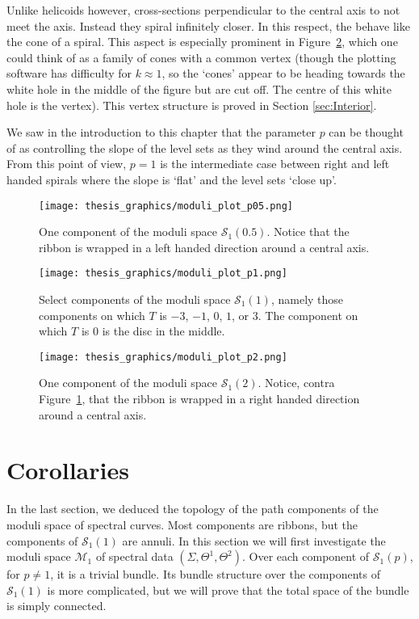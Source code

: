 Unlike helicoids however, cross-sections perpendicular to the central axis to not meet the axis. Instead they spiral infinitely closer. In this respect, the behave like the cone of a spiral. This aspect is especially prominent in Figure~\ref{fig:p1 plot}, which one could think of as a family of cones with a common vertex (though the plotting software has difficulty for $k\approx 1$, so the `cones' appear to be heading towards the white hole in the middle of the figure but are cut off. The centre of this white hole is the vertex). This vertex structure is proved in Section \ref{sec:Interior}.

We saw in the introduction to this chapter that the parameter $p$ can be thought of as controlling the slope of the level sets as they wind around the central axis. From this point of view, $p=1$ is the intermediate case between right and left handed spirals where the slope is `flat' and the level sets `close up'.

\begin{figure}
    \texttt{[image: thesis\_graphics/moduli\_plot\_p05.png]}
    \caption{One component of the moduli space $\mathcal{S}_1(0.5)$. Notice that the ribbon is wrapped in a left handed direction around a central axis.}
    \label{fig:p05 plot}
\end{figure}

\begin{figure}
    \texttt{[image: thesis\_graphics/moduli\_plot\_p1.png]}
    \caption{Select components of the moduli space $\mathcal{S}_1(1)$, namely those components on which $T$ is $-3$, $-1$, $0$, $1$, or $3$. The component on which $T$ is $0$ is the disc in the middle.}
    \label{fig:p1 plot}
\end{figure}

\begin{figure}
    \texttt{[image: thesis\_graphics/moduli\_plot\_p2.png]}
    \caption{One component of the moduli space $\mathcal{S}_1(2)$. Notice, contra Figure~\ref{fig:p05 plot}, that the ribbon is wrapped in a right handed direction around a central axis.}
    \label{fig:p2 plot}
\end{figure}



\section{Corollaries}
\label{sec:Corollaries}

In the last section, we deduced the topology of the path components of the moduli space of spectral curves. Most components are ribbons, but the components of $\mathcal{S}_1(1)$ are annuli. In this section we will first investigate the moduli space $\mathcal{M}_1$ of spectral data $(Σ,Θ^1,Θ^2)$. Over each component of $\mathcal{S}_1(p)$, for $p\neq 1$, it is a trivial bundle. Its bundle structure over the components of $\mathcal{S}_1(1)$ is more complicated, but we will prove that the total space of the bundle is simply connected.

